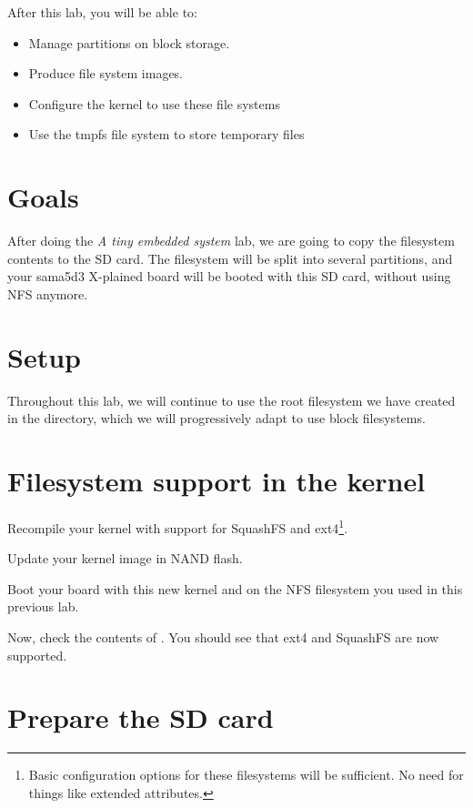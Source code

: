 
After this lab, you will be able to:
\begin{itemize}
\item Manage partitions on block storage.
\item Produce file system images.
\item Configure the kernel to use these file systems
\item Use the tmpfs file system to store temporary files
\end{itemize}

\section{Goals}

After doing the {\em A tiny embedded system} lab, we are going to copy
the filesystem contents to the SD card. The filesystem will be
split into several partitions, and your sama5d3 X-plained board will
be booted with this SD card, without using NFS anymore.

\section{Setup}

Throughout this lab, we will continue to use the root filesystem we
have created in the 
directory, which we will progressively adapt to use block filesystems.

\section{Filesystem support in the kernel}

Recompile your kernel with support for SquashFS and ext4\footnote{Basic
configuration options for these filesystems will be sufficient. No need
for things like extended attributes.}.

Update your kernel image in NAND flash.

Boot your board with this new kernel and on the NFS filesystem you
used in this previous lab.

Now, check the contents of . You should see
 that ext4 and SquashFS are now supported.

\section{Prepare the SD card}

